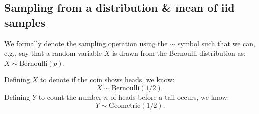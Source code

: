 \documentclass{article}
\begin{document}
\subsection{Sampling from a distribution \& mean of iid samples}
We formally denote the sampling operation using the $\sim$ symbol such that we can, e.g., say that a random variable $X$ is drawn from the Bernoulli distribution as: $X \sim \text{Bernoulli}(p)$. 
\begin{testexample}
    Defining $X$ to denote if the coin shows heads, we know:
    \begin{equation}
        X\sim\text{Bernoulli}(1/2).
    \end{equation}
    Defining $Y$ to count the number $n$ of heads before a tail occurs, we know:
    \begin{equation}
        Y\sim\text{Geometric}(1/2).
    \end{equation}
\end{testexample}
\end{document}

